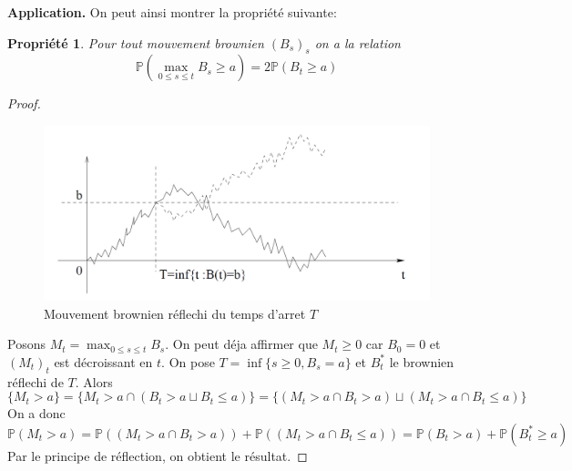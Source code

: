 \documentclass[a4paper]{article}
\newtheorem{propriete}{Propriété}[theorem]
\newtheorem{proof}{Démonstration}
\begin{document}
\textbf{Application.} On peut ainsi montrer la propriété suivante:
\begin{propriete}
    Pour tout mouvement brownien $(B_s)_s$ on a la relation
    \begin{equation*}
        \mathbb{P}(\max_{0\leq s \leq t} B_s \geq a) = 2 \mathbb{P}(B_t \geq a)
\end{equation*}
\end{propriete}
\begin{proof}
    \begin{figure}
    \centering
    \includegraphics[scale=0.5]{reflection principle.png}
    \caption{Mouvement brownien réflechi du temps d'arret $T$}
    \label{fig:enter-label}
\end{figure}
Posons $M_t = \max_{0\leq s \leq t} B_s$. On peut déja affirmer que $M_t \geq 0$ car $B_0 = 0$ et $(M_t)_t$ est décroissant en $t$.
On pose $T = \inf\{s\geq 0 , B_s=a\}$  et $B_t^*$ le brownien réflechi de $T$. Alors
\begin{equation*}
    \{M_t > a\} = \{ M_t > a \cap ( B_t > a \sqcup B_t \leq a )\} =
    \{ (M_t > a \cap B_t > a) \sqcup (M_t > a \cap B_t \leq a) \}
\end{equation*}
On a donc 
\begin{equation*}
    \mathbb{P}(M_t > a) = \mathbb{P}((M_t > a \cap B_t > a)) + \mathbb{P}((M_t > a \cap B_t \leq a)) = \mathbb{P}(B_t > a) + \mathbb{P}(B_t^* \geq a)
\end{equation*}
Par le principe de réflection, on obtient le résultat.

\end{proof}
\end{document}
